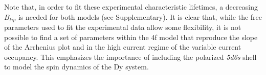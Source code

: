 \documentclass[
reprint,amsmath,amssymb,aps]{revtex4-2}
\begin{document}


Note that, in order to fit these experimental characteristic lifetimes, a decreasing $B_{tip}$ is needed for both models (see Supplementary). It is clear that, while the free parameters used to fit the experimental data allow some flexibility, it is not possible to find a set of parameters within the 4f model that reproduce the slope of the Arrhenius plot and in the high current regime of the variable current occupancy. This emphasizes the importance of including the polarized \textit{5d6s} shell to model the spin dynamics of the Dy system.
\end{document}
